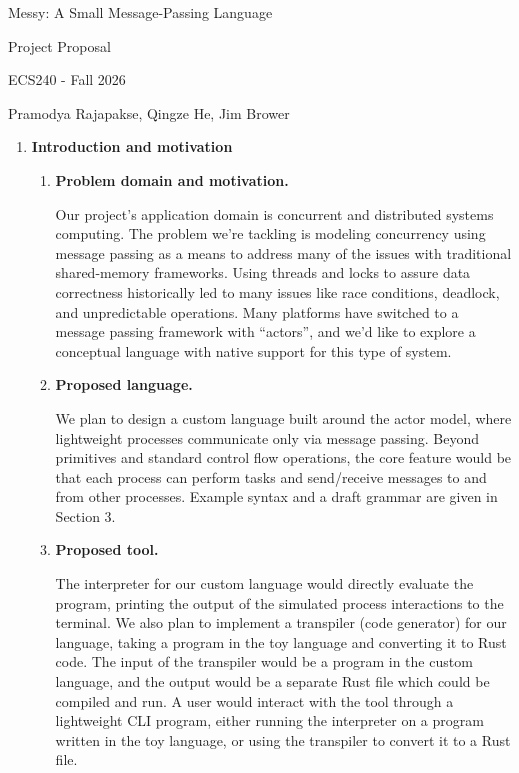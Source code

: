 \documentclass[11pt]{article}
\begin{document}
\begin{center}
{\Large Messy: A Small Message-Passing Language}

\medbreak
{\Large Project Proposal}

\medbreak
{\large ECS240 - Fall 2026}

\medbreak
{\large Pramodya Rajapakse, Qingze He, Jim Brower}
\end{center}
\vspace{1em}

\begin{enumerate}


\item
\textbf{Introduction and motivation}

\begin{enumerate}[label*=\arabic*.]

\item
\textbf{Problem domain and motivation.}

Our project's application domain is concurrent and distributed systems computing. The problem we're tackling is
modeling concurrency using message passing as a means to address many of the issues with traditional shared-memory
frameworks. Using threads and locks to assure data correctness historically led to many issues like race
conditions, deadlock, and unpredictable operations. Many platforms have switched to a message passing framework
with ``actors''\cite{armstrong2003making,vinoskierlang2012}, and we'd like to explore a conceptual language with
native support for this type of system.

\item
\textbf{Proposed language.}

We plan to design a custom language built around the actor model, where lightweight processes communicate only via
message passing. Beyond primitives and standard control flow operations, the core feature would be that each
process can perform tasks and send/receive messages to and from other processes. Example syntax and a draft grammar
are given in Section 3.

\item
\textbf{Proposed tool.}

The interpreter for our custom language would directly evaluate the program, printing the output of the simulated
process interactions to the terminal. We also plan to implement a transpiler (code generator) for our language,
taking a program in the toy language and converting it to Rust code. The input of the transpiler would be a program
in the custom language, and the output would be a separate Rust file which could be compiled and run. A user would
interact with the tool through a lightweight CLI program, either running the interpreter on a program written in
the toy language, or using the transpiler to convert it to a Rust file.


\end{enumerate}
\end{enumerate}
\end{document}
